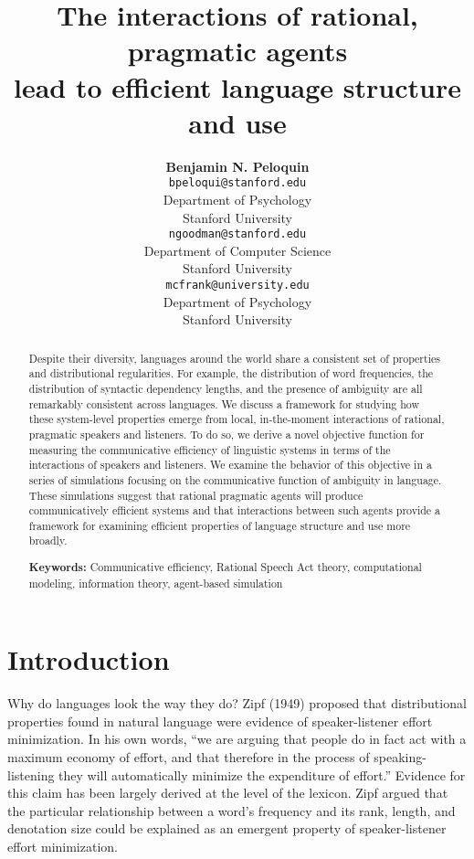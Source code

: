 \documentclass[10pt, letterpaper]{article}
\title{The interactions of rational, pragmatic agents\\
lead to efficient language structure and use}
\author{{\large \bf Benjamin N. Peloquin} \\ \texttt{bpeloqui@stanford.edu} \\ Department of Psychology \\ Stanford University \And {\large \bf Noah D. Goodman} \\ \texttt{ngoodman@stanford.edu} \\ Department of Computer Science \\ Stanford University \And {\large \bf Michael C. Frank} \\ \texttt{mcfrank@university.edu} \\ Department of Psychology \\ Stanford University}
\begin{document}
\maketitle

\begin{abstract}
Despite their diversity, languages around the world share a consistent
set of properties and distributional regularities. For example, the
distribution of word frequencies, the distribution of syntactic
dependency lengths, and the presence of ambiguity are all remarkably
consistent across languages. We discuss a framework for studying how
these system-level properties emerge from local, in-the-moment
interactions of rational, pragmatic speakers and listeners. To do so, we
derive a novel objective function for measuring the communicative
efficiency of linguistic systems in terms of the interactions of
speakers and listeners. We examine the behavior of this objective in a
series of simulations focusing on the communicative function of
ambiguity in language. These simulations suggest that rational pragmatic
agents will produce communicatively efficient systems and that
interactions between such agents provide a framework for examining
efficient properties of language structure and use more broadly.

\textbf{Keywords:}
Communicative efficiency, Rational Speech Act theory, computational
modeling, information theory, agent-based simulation
\end{abstract}

\section{Introduction}\label{introduction}

Why do languages look the way they do? Zipf (1949) proposed that
distributional properties found in natural language were evidence of
speaker-listener effort minimization. In his own words, ``we are arguing
that people do in fact act with a maximum economy of effort, and that
therefore in the process of speaking-listening they will automatically
minimize the expenditure of effort.'' Evidence for this claim has been
largely derived at the level of the lexicon. Zipf argued that the
particular relationship between a word's frequency and its rank, length,
and denotation size could be explained as an emergent property of
speaker-listener effort minimization. \par
\end{document}
